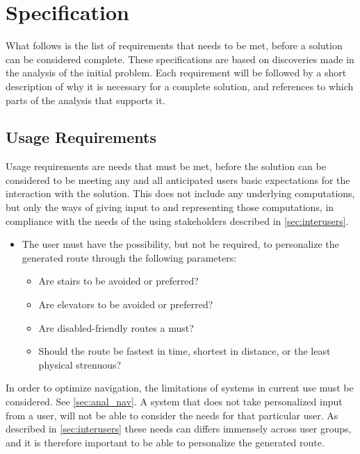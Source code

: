 \section{Specification} %
\label{sec:specification}

What follows is the list of requirements that needs to be met, before a solution can be considered complete. These specifications are based on discoveries made in the analysis of the initial problem. Each requirement will be followed by a short description of why it is necessary for a complete solution, and references to which parts of the analysis that supports it.

\subsection{Usage Requirements}

Usage requirements are needs that must be met, before the solution can be considered to be meeting any and all anticipated users basic expectations for the interaction with the solution. This does not include any underlying computations, but only the ways of giving input to and representing those computations, in compliance with the needs of the using stakeholders described in \cref{sec:interusers}.

\begin{itemize}
	\item The user must have the possibility, but not be required, to personalize the generated route through the following parameters:
			\begin{itemize}
				\item Are stairs to be avoided or preferred?
				\item Are elevators to be avoided or preferred?
				\item Are disabled-friendly routes a must?
				\item Should the route be fastest in time, shortest in distance, or the least physical strenuous?
			\end{itemize}
\end{itemize}

In order to optimize navigation, the limitations of systems in current use must be considered. See \cref{sec:anal_nav}. A system that does not take personalized input from a user, will not be able to consider the needs for that particular user. As described in \cref{sec:interusers} these needs can differs immensely across user groups, and it is therefore important to be able to personalize the generated route.

